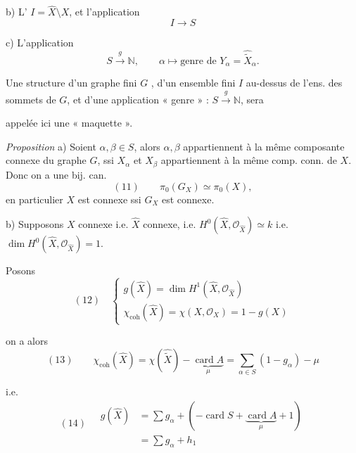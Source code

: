 \documentclass[11pt,a4paper]{article}
\begin{document}
b) L'  $I = \widehat{X} \setminus X$, et l'application
\[
I \longrightarrow S
\]

c) L'application
\[
S \xrightarrow{\ g\ } \mathbb{N}, \qquad \alpha \longmapsto \text{genre de } Y_{\alpha} = \widehat{\widetilde{X}}_{\alpha}.
\]

Une structure  d'un graphe fini $G$ , d'un ensemble fini $I$  au-dessus de l'ens. des sommets de $G$, et d'une application « genre » : $S \xrightarrow{g} \mathbb{N}$, sera


appelée ici une « maquette ».


\emph{Proposition} a) Soient $\alpha, \beta \in S$, alors $\alpha, \beta$ appartiennent à la même composante connexe du graphe $G$, ssi $X_{\alpha}$ et $X_{\beta}$ appartiennent à la même comp. conn. de $X$. Donc \struck{\ill{}} on a une bij. can.
\[
(11)\qquad \pi_{0}(G_{X}) \simeq \pi_{0}(X),
\]
en particulier $X$ est connexe ssi $G_{X}$ est connexe.

b) Supposons $X$ connexe i.e. $\widehat{X}$ connexe, i.e. $H^{0}(\widehat{X}, \mathcal{O}_{\widehat{X}}) \simeq k$ i.e. $\dim H^{0}(\widehat{X}, \mathcal{O}_{\widehat{X}}) = 1$.

Posons 
\begin{equation*}
(12)\quad
\begin{cases}
g(\widehat{X}) = \dim H^{1}(\widehat{X}, \mathcal{O}_{\widehat{X}})\\
\chi_{\mathrm{coh}}(\widehat{X}) = \chi(X, \mathcal{O}_{X}) = 1 - g(X)
\end{cases}
\end{equation*}

on a alors
\[
(13)\qquad \chi_{\mathrm{coh}}(\widehat{X}) = \chi(\widehat{\widetilde{X}}) - \underbrace{\operatorname{card} A}_{\mu} = \sum_{\alpha \in S} (1 - g_{\alpha}) - \mu
\]

i.e.
\begin{equation*}
(14)\quad
\begin{aligned}
g(\widehat{X}) &= \sum g_{\alpha} + (-\operatorname{card} S + \underbrace{\operatorname{card} A}_{\mu} + 1)\\
&= \sum g_{\alpha} + h_{1}
\end{aligned}
\end{equation*}
\end{document}
